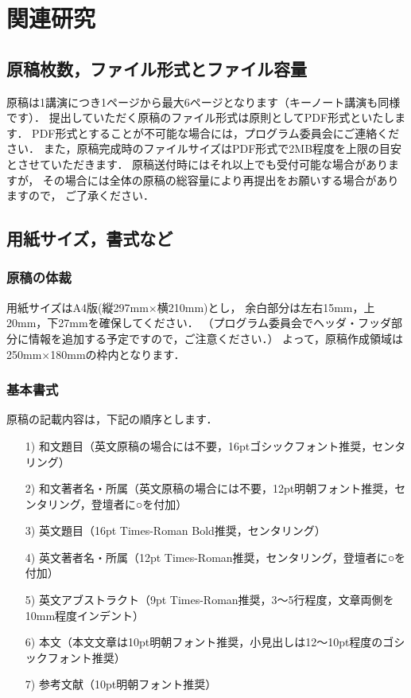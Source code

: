 \section{関連研究}
\subsection{原稿枚数，ファイル形式とファイル容量}
原稿は1講演につき1ページから最大6ページとなります（キーノート講演も同様です）．
提出していただく原稿のファイル形式は原則としてPDF形式といたします．
PDF形式とすることが不可能な場合には，プログラム委員会にご連絡ください．
また，原稿完成時のファイルサイズはPDF形式で2MB程度を上限の目安とさせていただきます．
原稿送付時にはそれ以上でも受付可能な場合がありますが，
その場合には全体の原稿の総容量により再提出をお願いする場合がありますので，
ご了承ください\cite{Shinjuku98, Shinjuku99}．
%
\subsection{用紙サイズ，書式など}
\subsubsection{原稿の体裁}
用紙サイズはA4版(縦297mm$\times$横210mm)とし，
余白部分は左右15mm，上20mm，下27mmを確保してください．
（プログラム委員会でヘッダ・フッダ部分に情報を追加する予定ですので，ご注意ください．）
よって，原稿作成領域は250mm$\times$180mmの枠内となります．
%
\subsubsection{基本書式}
原稿の記載内容は，下記の順序とします．
\begin{enumerate}
\setlength{\parskip}{0cm} %
\setlength{\itemsep}{0cm} %
\item[1)] 和文題目（英文原稿の場合には不要，16ptゴシックフォント推奨，センタリング）
\item[2)] 和文著者名・所属（英文原稿の場合には不要，12pt明朝フォント推奨，センタリング，登壇者に○を付加）
\item[3)] 英文題目（16pt Times-Roman Bold推奨，センタリング）
\item[4)] 英文著者名・所属（12pt Times-Roman推奨，センタリング，登壇者に○を付加）
\item[5)] 英文アブストラクト（9pt Times-Roman推奨，3〜5行程度，文章両側を10mm程度インデント）
\item[6)] 本文（本文文章は10pt明朝フォント推奨，小見出しは12〜10pt程度のゴシックフォント推奨）
\item[7)] 参考文献（10pt明朝フォント推奨）
\end{enumerate}
